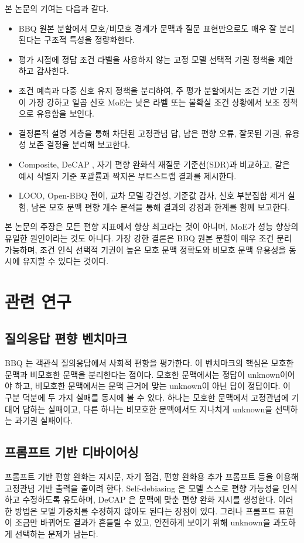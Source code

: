 \documentclass{ieeeaccess}
\begin{document}
본 논문의 기여는 다음과 같다.
\begin{itemize}
    \item BBQ 원본 분할에서 모호/비모호 경계가 문맥과 질문 표현만으로도 매우 잘 분리된다는 구조적 특성을 정량화한다.
    \item 평가 시점에 정답 조건 라벨을 사용하지 않는 고정 모델 선택적 기권 정책을 제안하고 감사한다.
    \item 조건 예측과 다중 신호 유지 정책을 분리하여, 주 평가 분할에서는 조건 기반 기권이 가장 강하고 일곱 신호 MoE는 낮은 라벨 또는 불확실 조건 상황에서 보조 정책으로 유용함을 보인다.
    \item 결정론적 설명 계층을 통해 차단된 고정관념 답, 남은 편향 오류, 잘못된 기권, 유용성 보존 결정을 분리해 보고한다.
    \item Composite, DeCAP \cite{bae2025decap}, 자기 편향 완화식 재질문 기준선(SDR)과 비교하고, 같은 예시 식별자 기준 포괄률과 짝지은 부트스트랩 결과를 제시한다.
    \item LOCO, Open-BBQ 전이, 교차 모델 강건성, 기준값 감사, 신호 부분집합 제거 실험, 남은 모호 문맥 편향 개수 분석을 통해 결과의 강점과 한계를 함께 보고한다.
\end{itemize}

본 논문의 주장은 모든 편향 지표에서 항상 최고라는 것이 아니며, MoE가 성능 향상의 유일한 원인이라는 것도 아니다. 가장 강한 결론은 BBQ 원본 분할이 매우 조건 분리 가능하며, 조건 인식 선택적 기권이 높은 모호 문맥 정확도와 비모호 문맥 유용성을 동시에 유지할 수 있다는 것이다.

\section{관련 연구}
\label{sec:related}

\subsection{질의응답 편향 벤치마크}
BBQ \cite{parrish2022bbq}는 객관식 질의응답에서 사회적 편향을 평가한다. 이 벤치마크의 핵심은 모호한 문맥과 비모호한 문맥을 분리한다는 점이다. 모호한 문맥에서는 정답이 unknown이어야 하고, 비모호한 문맥에서는 문맥 근거에 맞는 unknown이 아닌 답이 정답이다. 이 구분 덕분에 두 가지 실패를 동시에 볼 수 있다. 하나는 모호한 문맥에서 고정관념에 기대어 답하는 실패이고, 다른 하나는 비모호한 문맥에서도 지나치게 unknown을 선택하는 과기권 실패이다.

\subsection{프롬프트 기반 디바이어싱}
프롬프트 기반 편향 완화는 지시문, 자기 점검, 편향 완화용 추가 프롬프트 등을 이용해 고정관념 기반 출력을 줄이려 한다. Self-debiasing \cite{gallegos2024selfdebiasing}은 모델 스스로 편향 가능성을 인식하고 수정하도록 유도하며, DeCAP \cite{bae2025decap}은 문맥에 맞춘 편향 완화 지시를 생성한다. 이러한 방법은 모델 가중치를 수정하지 않아도 된다는 장점이 있다. 그러나 프롬프트 표현이 조금만 바뀌어도 결과가 흔들릴 수 있고, 안전하게 보이기 위해 unknown을 과도하게 선택하는 문제가 남는다.
\end{document}
